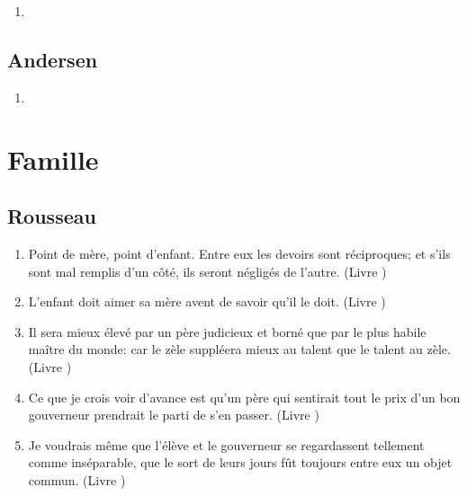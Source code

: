 \documentclass[a4paper, 11pt, hidelinks]{article}
\newcommand{\rb}[1]{\Romanbar{#1}}
\begin{document}
\begin{enumerate}
    \item 
\end{enumerate}




\subsection{Andersen}


\begin{enumerate}
    \item 
\end{enumerate}






































\section{Famille}



\subsection{Rousseau}


\begin{enumerate}
    \item Point de mère, point d'enfant. Entre eux les devoirs sont réciproques; et s'ils sont mal remplis d'un côté, ils seront négligés de l'autre. (Livre \rb{1})
    \item L'enfant doit aimer sa mère avent de savoir qu'il le doit. (Livre \rb{1})
    \item Il sera mieux élevé par un père judicieux et borné que par le plus habile maître du monde: car le zèle suppléera mieux au talent que le talent au zèle. (Livre \rb{1})
    \item Ce que je crois voir d'avance est qu'un père qui sentirait tout le prix d'un bon gouverneur prendrait le parti de s'en passer. (Livre \rb{1})
    \item Je voudrais même que l'élève et le gouverneur se regardassent tellement comme inséparable, que le sort de leurs jours fût toujours entre eux un objet commun. (Livre \rb{1})
\end{enumerate}
\end{document}
